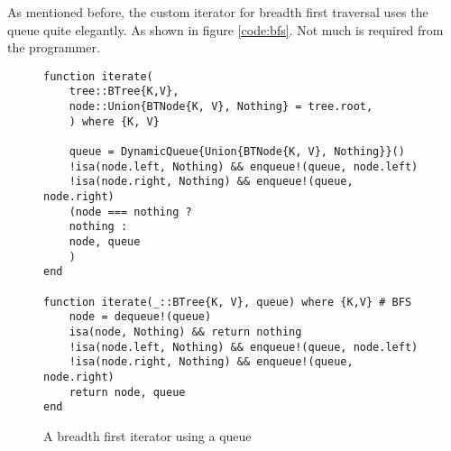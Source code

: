 \documentclass[a4paper, 11pt]{article}
\begin{document}
As mentioned before, the custom iterator for breadth first traversal uses the queue quite
elegantly. As shown in figure \autoref{code:bfs}. Not much is required from the programmer. 
    \begin{figure}[H]
        \centering
    \begin{verbatim}
function iterate(
    tree::BTree{K,V}, 
    node::Union{BTNode{K, V}, Nothing} = tree.root,
    ) where {K, V}

    queue = DynamicQueue{Union{BTNode{K, V}, Nothing}}()
    !isa(node.left, Nothing) && enqueue!(queue, node.left)
    !isa(node.right, Nothing) && enqueue!(queue, node.right)
    (node === nothing ?
    nothing :
    node, queue 
    )
end

function iterate(_::BTree{K, V}, queue) where {K,V} # BFS
    node = dequeue!(queue)
    isa(node, Nothing) && return nothing
    !isa(node.left, Nothing) && enqueue!(queue, node.left)
    !isa(node.right, Nothing) && enqueue!(queue, node.right)
    return node, queue 
end
    \end{verbatim}
    \caption{A breadth first iterator using a queue}
    \label{code:bfs}
    \end{figure}
    



\end{document}
